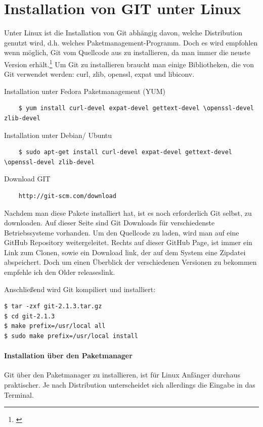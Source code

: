 \documentclass[12pt,a4paper,bibliography=totocnumbered,listof=totocnumbered]{scrartcl}
\begin{document}
\section{Installation von GIT unter Linux}
Unter Linux ist die Installation von Git abhängig davon, welche Distribution genutzt wird, d.h. welches Paketmanagement-Programm. Doch es wird empfohlen wenn möglich, Git vom Quellcode aus zu installieren, da man immer die neuste Version erhält.\footnote{\cite{chacon2009pro}} Um Git zu installieren braucht man einige Bibliotheken, die von Git verwendet werden: curl, zlib, openssl, expat und libiconv. 

Installation unter Fedora Paketmanagement (YUM)
\begin{lstlisting}
	$ yum install curl-devel expat-devel gettext-devel \openssl-devel zlib-devel
 \end{lstlisting}

Installation unter Debian/ Ubuntu
\begin{lstlisting}
	$ sudo apt-get install curl-devel expat-devel gettext-devel \openssl-devel zlib-devel
 \end{lstlisting}
 
Download GIT

\begin{lstlisting}
	http://git-scm.com/download
 \end{lstlisting}
 
 
Nachdem man diese Pakete installiert hat, ist es noch erforderlich Git selbst, zu downloaden. Auf dieser Seite sind Git Downloads für verschiedenste Betriebssysteme vorhanden. Um den Quellcode zu laden, wird man auf eine GitHub Repository weitergeleitet. Rechts auf dieser GitHub Page, ist immer ein Link zum Clonen, sowie ein Download link, der auf dem System eine Zipdatei abspeichert. Doch um einen Überblick der verschiedenen Versionen zu bekommen 
empfehle ich den  	\grqq Older releases\grqq  link.

Anschließend wird Git kompiliert und installiert:
\begin{lstlisting}
$ tar -zxf git-2.1.3.tar.gz
$ cd git-2.1.3
$ make prefix=/usr/local all
$ sudo make prefix=/usr/local install
 \end{lstlisting}

\paragraph{Installation über den Paketmanager}

Git über den Paketmanager zu installieren, ist für Linux Anfänger durchaus praktischer. Je nach Distribution unterscheidet sich allerdings die Eingabe in das Terminal.
\end{document}
